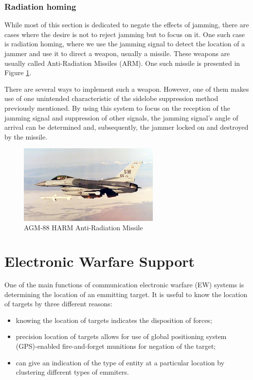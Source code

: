\documentclass[english,purist]{ist-report}
\begin{document}
\section{Radiation homing}

While most of this section is dedicated to negate the effects of jamming, there are cases where the desire is not to reject jamming but to focus on it. One such case is radiation homing, where we use the jamming signal to detect the location of a jammer and use it to direct a weapon, usually a missile. These weapons are usually called Anti-Radiation Missiles (ARM). One such missile is presented in Figure \ref{arm_missile}.

There are several ways to implement such a weapon. However, one of them makes use of one unintended characteristic of the sidelobe suppression method previously mentioned. By using this system to focus on the reception of the jamming signal and suppression of other signals, the jamming signal's angle of arrival can be determined and, subsequently, the jammer locked on and destroyed by the missile.

\begin{figure}[ht]
\centering
\includegraphics[width=70mm]{arm_missile.jpg}
\caption{AGM-88 HARM Anti-Radiation Missile}
\label{arm_missile}
\end{figure}

\part{Electronic Warfare Support}

One of the main functions of communication electronic warfare (EW) systems is determining the location of an emmitting target. 
It is useful to know the location of targets by three different reasons:

\begin{itemize}
    \item knowing the location of targets indicates the disposition of forces;
    \item precision location of targets allows for use of global positioning system (GPS)-enabled fire-and-forget munitions for negation of the target;
    \item can give an indication of the type of entity at a particular location by clustering different types of emmiters. 
\end{itemize}
\end{document}

